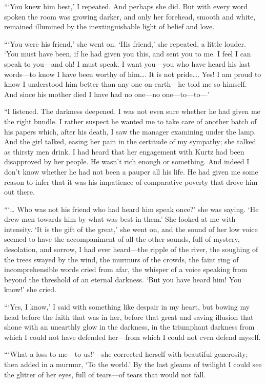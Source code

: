 \documentclass[12pt]{report}
\begin{document}
```You knew him best,' I repeated. And perhaps she did. But with every
word spoken the room was growing darker, and only her forehead, smooth
and white, remained illumined by the inextinguishable light of belief
and love.

```You were his friend,' she went on. `His friend,' she repeated, a
little louder. `You must have been, if he had given you this, and sent
you to me. I feel I can speak to you---and oh! I must speak. I want
you---you who have heard his last words---to know I have been worthy of
him\ldots{}. It is not pride\ldots{}. Yes! I am proud to know I
understood him better than any one on earth---he told me so himself. And
since his mother died I have had no one---no one---to---to---'

``I listened. The darkness deepened. I was not even sure whether he had
given me the right bundle. I rather suspect he wanted me to take care of
another batch of his papers which, after his death, I saw the manager
examining under the lamp. And the girl talked, easing her pain in the
certitude of my sympathy; she talked as thirsty men drink. I had heard
that her engagement with Kurtz had been disapproved by her people. He
wasn't rich enough or something. And indeed I don't know whether he had
not been a pauper all his life. He had given me some reason to infer
that it was his impatience of comparative poverty that drove him out
there.

```\ldots{} Who was not his friend who had heard him speak once?' she
was saying. `He drew men towards him by what was best in them.' She
looked at me with intensity. `It is the gift of the great,' she went on,
and the sound of her low voice seemed to have the accompaniment of all
the other sounds, full of mystery, desolation, and sorrow, I had ever
heard---the ripple of the river, the soughing of the trees swayed by the
wind, the murmurs of the crowds, the faint ring of incomprehensible
words cried from afar, the whisper of a voice speaking from beyond the
threshold of an eternal darkness. `But you have heard him! You know!'
she cried.

```Yes, I know,' I said with something like despair in my heart, but
bowing my head before the faith that was in her, before that great and
saving illusion that shone with an unearthly glow in the darkness, in
the triumphant darkness from which I could not have defended her---from
which I could not even defend myself.

```What a loss to me---to us!'---she corrected herself with beautiful
generosity; then added in a murmur, `To the world.' By the last gleams
of twilight I could see the glitter of her eyes, full of tears---of
tears that would not fall.
\end{document}
